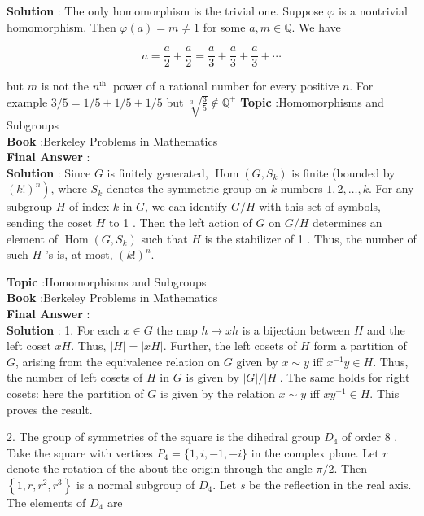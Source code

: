 \documentclass[10pt]{article}
\begin{document}
\textbf{Solution} : The only homomorphism is the trivial one. Suppose $\varphi$ is a nontrivial homomorphism. Then $\varphi(a)=m \neq 1$ for some $a, m \in \mathbb{Q}$. We have

$$
a=\frac{a}{2}+\frac{a}{2}=\frac{a}{3}+\frac{a}{3}+\frac{a}{3}+\cdots
$$

but $m$ is not the $n^{\text {ih }}$ power of a rational number for every positive $n$. For example $3 / 5=1 / 5+1 / 5+1 / 5$ but $\sqrt[3]{\frac{3}{5}} \notin \mathbb{Q}^{+}$
\textbf{Topic} :Homomorphisms and Subgroups \\
\textbf{Book} :Berkeley Problems in Mathematics\\
\textbf{Final Answer} :\\


\textbf{Solution} : Since $G$ is finitely generated, $\operatorname{Hom}\left(G, S_{k}\right)$ is finite (bounded by $\left.(k !)^{n}\right)$, where $S_{k}$ denotes the symmetric group on $k$ numbers $1,2, \ldots, k$. For any subgroup $H$ of index $k$ in $G$, we can identify $G / H$ with this set of symbols, sending the coset $H$ to 1 . Then the left action of $G$ on $G / H$ determines an element of $\operatorname{Hom}\left(G, S_{k}\right)$ such that $H$ is the stabilizer of 1 . Thus, the number of such $H$ 's is, at most, $(k !)^{n}$.


\textbf{Topic} :Homomorphisms and Subgroups \\
\textbf{Book} :Berkeley Problems in Mathematics\\
\textbf{Final Answer} :\\


\textbf{Solution} : 1. For each $x \in G$ the map $h \mapsto x h$ is a bijection between $H$ and the left coset $x H$. Thus, $|H|=|x H|$. Further, the left cosets of $H$ form a partition of $G$, arising from the equivalence relation on $G$ given by $x \sim y$ iff $x^{-1} y \in H$. Thus, the number of left cosets of $H$ in $G$ is given by $|G| /|H|$. The same holds for right cosets: here the partition of $G$ is given by the relation $x \sim y$ iff $x y^{-1} \in H$. This proves the result.

2. The group of symmetries of the square is the dihedral group $D_{4}$ of order 8 . Take the square with vertices $P_{4}=\{1, i,-1,-i\}$ in the complex plane. Let $r$ denote the rotation of the about the origin through the angle $\pi / 2$. Then $\left\{1, r, r^{2}, r^{3}\right\}$ is a normal subgroup of $D_{4}$. Let $s$ be the reflection in the real axis. The elements of $D_{4}$ are
\end{document}
